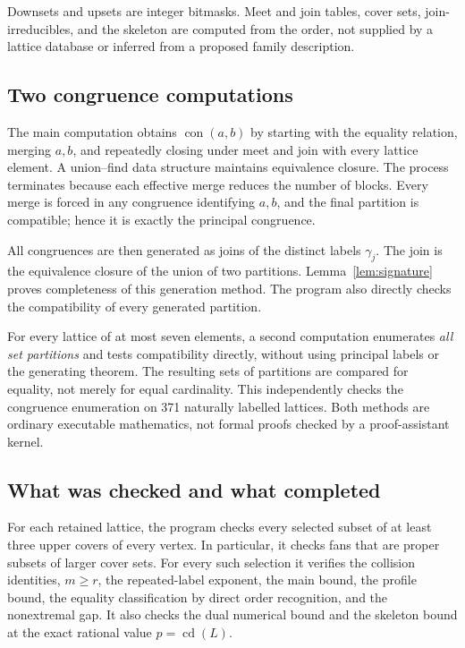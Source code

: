 \documentclass[11pt,a4paper]{article}
\numberwithin{equation}{section}
\theoremstyle{definition}
\theoremstyle{remark}
\DeclareMathOperator{\con}{con}
\DeclareMathOperator{\cdens}{cd}
\begin{document}
Downsets and upsets are integer bitmasks. Meet and join tables, cover sets,
join-irreducibles, and the skeleton are computed from the order, not supplied
by a lattice database or inferred from a proposed family description.

\subsection{Two congruence computations}
The main computation obtains $\con(a,b)$ by starting with the equality relation,
merging $a,b$, and repeatedly closing under meet and join with every lattice
element. A union--find data structure maintains equivalence closure.
The process terminates because each effective merge reduces the number of
blocks. Every merge is forced in any congruence identifying $a,b$, and the final
partition is compatible; hence it is exactly the principal congruence.

All congruences are then generated as joins of the distinct labels $\gamma_j$.
The join is the equivalence closure of the union of two partitions.
Lemma~\ref{lem:signature} proves completeness of this generation method.
The program also directly checks the compatibility of every generated partition.

For every lattice of at most seven elements, a second computation enumerates
\emph{all set partitions} and tests compatibility directly, without using
principal labels or the generating theorem. The resulting sets of partitions
are compared for equality, not merely for equal cardinality.
This independently checks the congruence enumeration on 371 naturally labelled
lattices. Both methods are ordinary executable mathematics, not formal proofs
checked by a proof-assistant kernel.

\subsection{What was checked and what completed}
For each retained lattice, the program checks every selected subset of at least
three upper covers of every vertex. In particular, it checks fans that are
proper subsets of larger cover sets. For every such selection it verifies the
collision identities, $m\ge r$, the repeated-label exponent, the main bound,
the profile bound, the equality classification by direct order recognition,
and the nonextremal gap. It also checks the dual numerical bound and the
skeleton bound at the exact rational value $p=\cdens(L)$.
\end{document}
